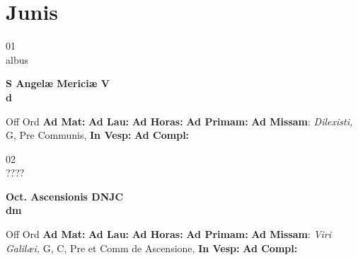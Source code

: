 \documentclass[10pt, openany]{book}
\begin{document}
    \chapter{Junis}
                    
    \begin{center}
        \begin{minipage}{3.5in}
            \vspace{2em}
            \begin{minipage}{0.5in}
                {\Huge 01} \\
                {\normalsize albus}
            \end{minipage}
            \begin{minipage}{3.0in}
                \textbf{ \large S Angelæ Mericiæ V \\
                \textnormal{\normalsize d}}

            \end{minipage}
            \begin{justify}Off Ord
                \textbf{Ad Mat: }
                \textbf{Ad Lau: }
                \textbf{Ad Horas: }
                \textbf{Ad Primam: }\textbf{Ad Missam}: \textit{Dilexisti,} G, Pre Communis, 
                \textbf{In Vesp: }
                \textbf{Ad Compl: }
            \end{justify}
        \end{minipage}
    \end{center}

    \begin{center}
        \begin{minipage}{3.5in}
            \vspace{2em}
            \begin{minipage}{0.5in}
                {\Huge 02} \\
                {\normalsize ????}
            \end{minipage}
            \begin{minipage}{3.0in}
                \textbf{ \large Oct. Ascensionis DNJC \\
                \textnormal{\normalsize dm}}

            \end{minipage}
            \begin{justify}Off Ord
                \textbf{Ad Mat: }
                \textbf{Ad Lau: }
                \textbf{Ad Horas: }
                \textbf{Ad Primam: }\textbf{Ad Missam}: \textit{Viri Galilæi,} G, C, Pre et Comm de Ascensione, 
                \textbf{In Vesp: }
                \textbf{Ad Compl: }
            \end{justify}
        \end{minipage}
    \end{center}
\end{document}
